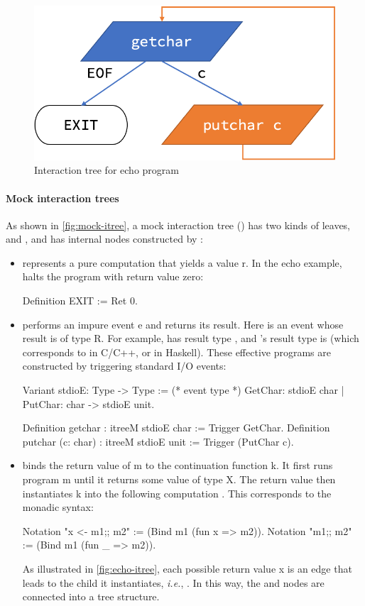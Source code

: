 \begin{figure}
  \includegraphics[width=.5\linewidth]{figures/echo-itree}
  \caption{Interaction tree for echo program}
  \label{fig:echo-itree}
\end{figure}

\paragraph{Mock interaction trees}
As shown in \autoref{fig:mock-itree}, a mock interaction tree () has
two kinds of leaves,  and , and has internal nodes
constructed by :
\begin{itemize}
\item {} represents a pure computation that yields a value \ilc r.
  In the echo example,  halts the program with return value zero:
\begin{coq}
  Definition EXIT := Ret 0.
\end{coq}

\item {} performs an impure event \ilc e and returns its result.
  Here  is an event whose result is of type \ilc R.  For example,
   has result type , and 's result type is
   (which corresponds to  in C/C++, or \ilc{()} in
  Haskell).  These effective programs are constructed by triggering standard I/O
  events:
\begin{coq}
  Variant stdioE: Type -> Type := (* event type *)
    GetChar:         stdioE char
  | PutChar: char -> stdioE unit.
  
  Definition getchar           : itreeM stdioE char := Trigger  GetChar.
  Definition putchar (c: char) : itreeM stdioE unit := Trigger (PutChar c).
\end{coq}
\item {} binds the return value of \ilc m to the continuation
  function \ilc k.  It first runs program \ilc m until it returns some value of
  type \ilc X.  The return value  then instantiates \ilc k into the
  following computation .  This corresponds to the
  monadic \ilc{(;;)} syntax:
\begin{coq}
  Notation "x <- m1;; m2" := (Bind m1 (fun x => m2)).
  Notation "m1;; m2"      := (Bind m1 (fun _ => m2)).
\end{coq}

As illustrated in \autoref{fig:echo-itree}, each possible return value \ilc x is
an edge that leads to the child it instantiates, {\it i.e.}, .  In this
way, the  and  nodes are connected into a tree
structure.
\end{itemize}

